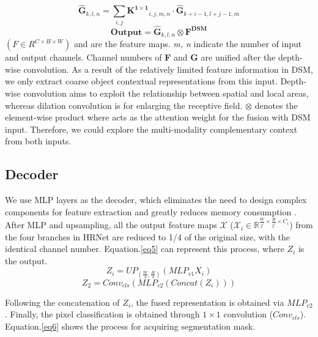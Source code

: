 \documentclass[lettersize,journal]{IEEEtran}
\begin{document}
\begin{equation}
    \hat{\mathbf{G}}_{k, l, n}=\sum_{i, j} \mathbf{K^{1\times 1}}_{i, j, m,n} \cdot \hat{\mathbf{G}}_{k+i-1, l+j-1, m} 
\label{eq11}   
\end{equation}
\begin{equation}
    \mathbf{Output} = \hat{\mathbf{G}}_{k, l, n}\otimes \mathbf{F^{DSM}}
\label{eqOutput}   
\end{equation}
  $(F\in R^{C\times H \times W})$  and  are the feature maps. \emph{m, n} indicate the number of input and output channels. Channel numbers of \textbf{F} and \textbf{G} are unified after the depth-wise convolution. As a result of the relatively limited feature information in DSM, we only extract coarse object contextual representations from this input. Depth-wise convolution aims to exploit the relationship between spatial and local areas, whereas dilation convolution is for enlarging the receptive field. $\otimes$ denotes the element-wise product where  acts as the attention weight for the fusion with DSM input. Therefore, we could explore the multi-modality complementary context from both inputs. 
 \subsection{Decoder}
 We use MLP layers as the decoder, which eliminates the need to design complex components for feature extraction and greatly reduces memory consumption \cite{xieSegFormerSimpleEfficient2021}.  After MLP and upsampling, all the output feature maps \(\mathcal{X} \) (\( \mathcal{X}_{i} \in \mathbb{R}^{\frac{W}{2^{i}} \times \frac{H}{2^{i}} \times C_{i}}\)) from the four branches in HRNet are reduced to 1/4 of the original size, with the identical channel number. Equation.\eqref{eq5} can represent this process, where ${Z_i}$ is the output. 
 \begin{equation}
    {Z_i} = U{P_{(\frac{W}{4},\frac{H}{4})}}({MLP_{v1}}{X_i})
 \label{eq5}
    \end{equation}
\begin{equation}
{Z_2} =  {Conv_{cls}}({MLP_{v2}}(Concat({Z_i})))
\label{eq6}
\end{equation}

Following the concatenation of ${Z_i}$, the fused representation is obtained via $MLP_{v2}$. Finally, the pixel classification is obtained through $1\times 1$  convolution ($Conv_{cls}$). Equation.\eqref{eq6} shows the process for acquiring segmentation mask.
\end{document}
